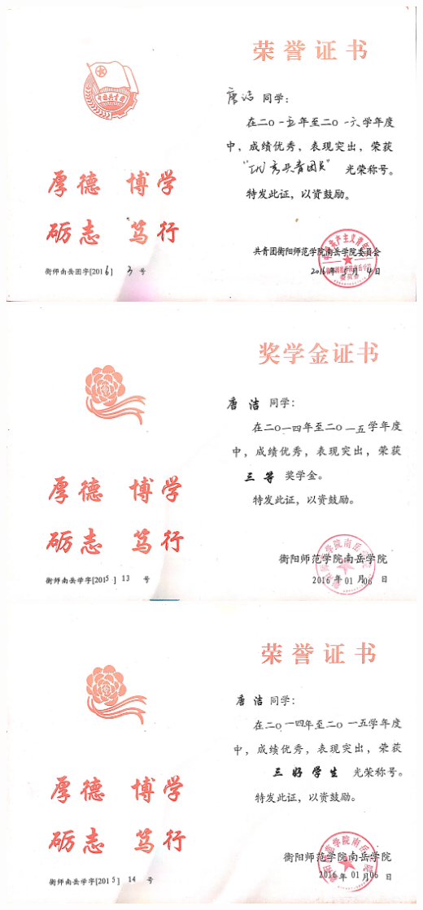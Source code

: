 \documentclass[UFT8]{ctexart}%
\begin{document}
\begin{center}
 \includegraphics[scale=0.1]{figs/2016-05.jpg }
 \includegraphics[scale=0.1]{figs/2016-01_1.jpg }
 \includegraphics[scale=0.1]{figs/2016-01_2.jpg }

\end{center}
\end{document}
